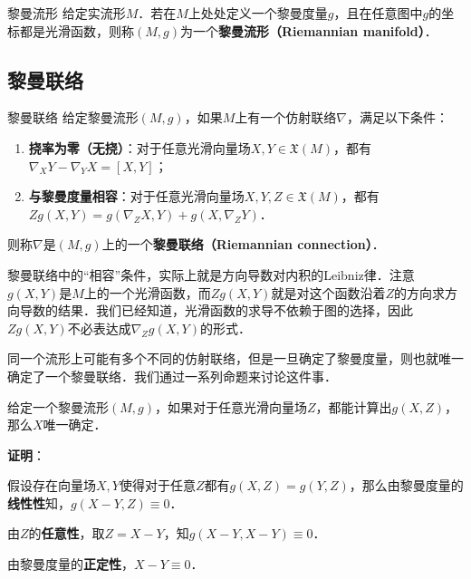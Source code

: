 \begin{definition}{黎曼流形}
给定实流形$M$．若在$M$上处处定义一个黎曼度量$g$，且在任意图中$g$的坐标都是光滑函数，则称$(M, g)$为一个\textbf{黎曼流形（Riemannian manifold）}．
\end{definition}





\subsection{黎曼联络}

\begin{definition}{黎曼联络}\label{RieCon_def1}
给定黎曼流形$(M, g)$，如果$M$上有一个仿射联络$\nabla$，满足以下条件：
\begin{enumerate}
\item \textbf{挠率为零（无挠）}：对于任意光滑向量场$X, Y\in\mathfrak{X}(M)$，都有$\nabla_XY-\nabla_YX={[X, Y]}$；
\item \textbf{与黎曼度量相容}：对于任意光滑向量场$X, Y, Z\in\mathfrak{X}(M)$，都有$Zg(X, Y)=g(\nabla_ZX, Y)+g(X, \nabla_ZY)$．
\end{enumerate}
则称$\nabla$是$(M, g)$上的一个\textbf{黎曼联络（Riemannian connection）}．
\end{definition}

黎曼联络中的“相容”条件，实际上就是方向导数对内积的Leibniz律．注意$g(X, Y)$是$M$上的一个光滑函数，而$Zg(X, Y)$就是对这个函数沿着$Z$的方向求方向导数的结果．我们已经知道，光滑函数的求导不依赖于图的选择，因此$Zg(X, Y)$不必表达成$\nabla_Zg(X, Y)$的形式．

同一个流形上可能有多个不同的仿射联络，但是一旦确定了黎曼度量，则也就唯一确定了一个黎曼联络．我们通过一系列命题来讨论这件事．







\begin{lemma}{}\label{RieCon_lem1}
给定一个黎曼流形$(M, g)$，如果对于任意光滑向量场$Z$，都能计算出$g(X, Z)$，那么$X$唯一确定．
\end{lemma}

\textbf{证明}：

假设存在向量场$X, Y$使得对于任意$Z$都有$g(X, Z)=g(Y, Z)$，那么由黎曼度量的\textbf{线性性}知，$g(X-Y, Z)\equiv 0$．

由$Z$的\textbf{任意性}，取$Z=X-Y$，知$g(X-Y, X-Y)\equiv 0$．

由黎曼度量的\textbf{正定性}，$X-Y\equiv 0$．

